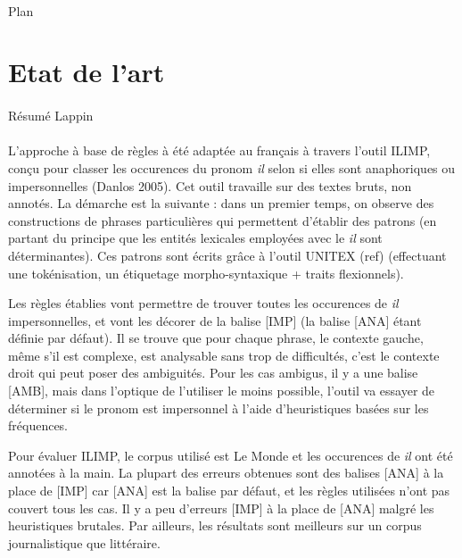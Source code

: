 \documentclass[a4paper,12pt]{article}
\begin{document}
\paragraph{}
Plan


\section{Etat de l'art}

\paragraph{}
Résumé Lappin

\paragraph{}
L'approche à base de règles à été adaptée au français à travers l'outil ILIMP, conçu pour classer les occurences du pronom \og{}\textit{il}\fg{} selon si elles sont anaphoriques ou impersonnelles (Danlos 2005). Cet outil travaille sur des textes bruts, non annotés.
La démarche est la suivante : dans un premier temps, on observe des constructions de phrases particulières qui permettent d'établir des patrons (en partant du principe que les entités lexicales employées avec le \og{}\textit{il}\fg{} sont déterminantes). Ces patrons sont écrits grâce à l'outil UNITEX (ref) (effectuant une tokénisation, un étiquetage morpho-syntaxique + traits flexionnels).

Les règles établies vont permettre de trouver toutes les occurences de \og{}\textit{il}\fg{} impersonnelles, et vont les décorer de la balise [IMP] (la balise [ANA] étant définie par défaut).
Il se trouve que pour chaque phrase, le contexte gauche, même s'il est complexe, est analysable sans trop de difficultés, c'est le contexte droit qui peut poser des ambiguités.
Pour les cas ambigus, il y a une balise [AMB], mais dans l'optique de l'utiliser le moins possible, l'outil va essayer de déterminer si le pronom est impersonnel à l'aide d'heuristiques basées sur les fréquences.

Pour évaluer ILIMP, le corpus utilisé est Le Monde et les occurences de \og{}\textit{il}\fg{} ont été annotées à la main. La plupart des erreurs obtenues sont des balises [ANA] à la place de [IMP] car [ANA] est la balise par défaut, et les règles utilisées n'ont pas couvert tous les cas. Il y a peu d'erreurs [IMP] à la place de [ANA] malgré les heuristiques brutales.
Par ailleurs, les résultats sont meilleurs sur un corpus journalistique que littéraire.
\end{document}
